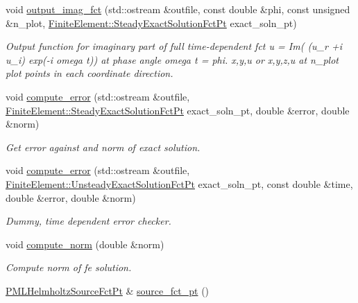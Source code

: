 \begin{DoxyCompactItemize}
void \hyperlink{classoomph_1_1PMLHelmholtzEquationsBase_a87bf6ae358dbcf6614b97e8e92810ef3}{output\+\_\+imag\+\_\+fct} (std\+::ostream \&outfile, const double \&phi, const unsigned \&n\+\_\+plot, \hyperlink{classoomph_1_1FiniteElement_a690fd33af26cc3e84f39bba6d5a85202}{Finite\+Element\+::\+Steady\+Exact\+Solution\+Fct\+Pt} exact\+\_\+soln\+\_\+pt)
\begin{DoxyCompactList}\small\item\em Output function for imaginary part of full time-\/dependent fct u = Im( (u\+\_\+r +i u\+\_\+i) exp(-\/i omega t)) at phase angle omega t = phi. x,y,u or x,y,z,u at n\+\_\+plot plot points in each coordinate direction. \end{DoxyCompactList}\item 
void \hyperlink{classoomph_1_1PMLHelmholtzEquationsBase_a85866aff4a5644c26663ca73ed166c1b}{compute\+\_\+error} (std\+::ostream \&outfile, \hyperlink{classoomph_1_1FiniteElement_a690fd33af26cc3e84f39bba6d5a85202}{Finite\+Element\+::\+Steady\+Exact\+Solution\+Fct\+Pt} exact\+\_\+soln\+\_\+pt, double \&error, double \&norm)
\begin{DoxyCompactList}\small\item\em Get error against and norm of exact solution. \end{DoxyCompactList}\item 
void \hyperlink{classoomph_1_1PMLHelmholtzEquationsBase_a6cd8d2dfd17ff66f86faa87cc25ad113}{compute\+\_\+error} (std\+::ostream \&outfile, \hyperlink{classoomph_1_1FiniteElement_ad4ecf2b61b158a4b4d351a60d23c633e}{Finite\+Element\+::\+Unsteady\+Exact\+Solution\+Fct\+Pt} exact\+\_\+soln\+\_\+pt, const double \&time, double \&error, double \&norm)
\begin{DoxyCompactList}\small\item\em Dummy, time dependent error checker. \end{DoxyCompactList}\item 
void \hyperlink{classoomph_1_1PMLHelmholtzEquationsBase_ae426e5240fc08c0bee0f34862b22b286}{compute\+\_\+norm} (double \&norm)
\begin{DoxyCompactList}\small\item\em Compute norm of fe solution. \end{DoxyCompactList}\item 
\hyperlink{classoomph_1_1PMLHelmholtzEquationsBase_abf57477abc2672cd680742e17721a07f}{P\+M\+L\+Helmholtz\+Source\+Fct\+Pt} \& \hyperlink{classoomph_1_1PMLHelmholtzEquationsBase_afc6e1b81652e12e1dcb7685baa02fce8}{source\+\_\+fct\+\_\+pt} ()

\end{DoxyCompactItemize}
